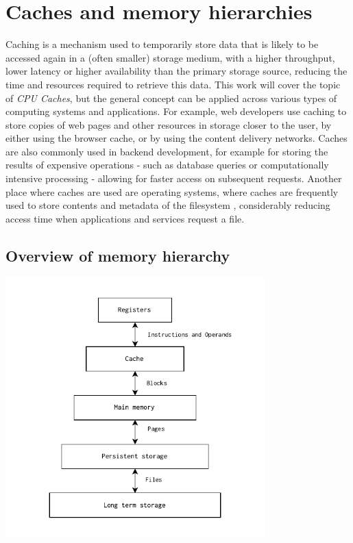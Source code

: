 \section{Caches and memory hierarchies}

Caching is a mechanism used to temporarily store data that is likely to be accessed again in a (often smaller) storage medium, with a higher throughput, lower latency or higher
availability than the primary storage source, reducing the time and resources required to retrieve this data.
This work will cover the topic of \textit{CPU Caches}, but the general concept can be applied across
various types of computing systems and applications.
For example, web developers use caching to store copies of web pages and other resources in storage closer to the user, by either using the browser cache, or by using the content delivery networks.
Caches are also commonly used in backend development, for example for storing the results of expensive operations - such as database queries or computationally intensive processing -
allowing for faster access on subsequent requests. Another place where caches are used are operating systems, where caches are frequently used to store contents and metadata of
the filesystem \cite{linuxfscache}, considerably reducing access time when applications and services request a file.

\subsection{Overview of memory hierarchy} \label{sec:memhier}

\begin{center}
	\centering
	\includegraphics[width=0.75\textwidth]{figures/02-background/memhier.pdf}
	\label{fig:memhier}
\end{center}


